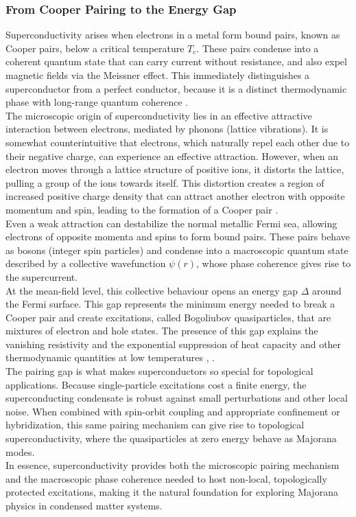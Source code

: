 \subsubsection{From Cooper Pairing to the Energy Gap}
Superconductivity arises when electrons in a metal form bound pairs, known as Cooper pairs, below a critical temperature $T_c$. These pairs condense into a coherent quantum state that can carry current without resistance, and also expel magnetic fields via the Meissner effect. This immediately distinguishes a superconductor from a perfect conductor, because it is a distinct thermodynamic phase with long-range quantum coherence \cite{Cambridge_MBPhysics}.\\
The microscopic origin of superconductivity lies in an effective attractive interaction between electrons, mediated by phonons (lattice vibrations). It is somewhat counterintuitive that electrons, which naturally repel each other due to their negative charge, can experience an effective attraction. However, when an electron moves through a lattice structure of positive ions, it distorts the lattice, pulling a group of the ions towards itself. This distortion creates a region of increased positive charge density that can attract another electron with opposite momentum and spin, leading to the formation of a Cooper pair \cite{Physics_libretexts_2025}.\\
Even a weak attraction can destabilize the normal metallic Fermi sea, allowing electrons of opposite momenta and spins to form bound pairs. These pairs behave as bosons (integer spin particles) and condense into a macroscopic quantum state described by a collective wavefunction $ψ(r)$, whose phase coherence gives rise to the supercurrent.\\
At the mean-field level, this collective behaviour opens an energy gap $Δ$ around the Fermi surface. This gap represents the minimum energy needed to break a Cooper pair and create excitations, called Bogoliubov quasiparticles, that are mixtures of electron and hole states. The presence of this gap explains the vanishing resistivity and the exponential suppression of heat capacity and other thermodynamic quantities at low temperatures \cite{Cambridge_MBPhysics}, \cite{BCS}.\\
The pairing gap is what makes superconductors so special for topological applications. Because single-particle excitations cost a finite energy, the superconducting condensate is robust against small perturbations and other local noise. When combined with spin-orbit coupling and appropriate confinement or hybridization, this same pairing mechanism can give rise to topological superconductivity, where the quasiparticles at zero energy behave as Majorana modes.\\
In essence, superconductivity provides both the microscopic pairing mechanism and the macroscopic phase coherence needed to host non-local, topologically protected excitations, making it the natural foundation for exploring Majorana physics in condensed matter systems.

